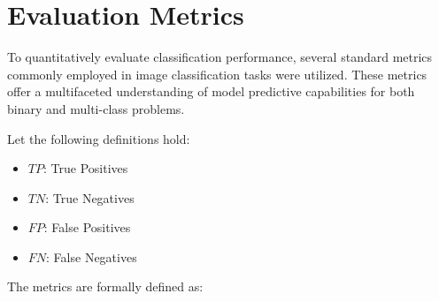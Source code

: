\section{Evaluation Metrics}\label{sec:evaluation-metrics}

To quantitatively evaluate classification performance, several standard metrics commonly employed in image
classification tasks were utilized. These metrics offer a multifaceted understanding of model predictive
capabilities for both binary and multi-class problems.

Let the following definitions hold:
\begin{itemize}
    \item $TP$: True Positives
    \item $TN$: True Negatives
    \item $FP$: False Positives
    \item $FN$: False Negatives
\end{itemize}

The metrics are formally defined as:

